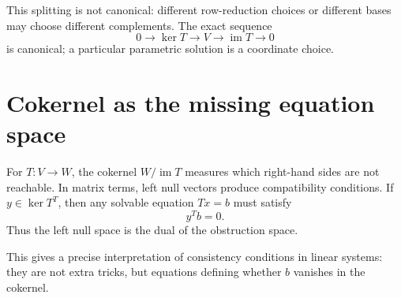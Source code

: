 This splitting is not canonical: different row-reduction choices or different bases may choose different complements.  The exact sequence
\[
  0\to\ker T\to V\to\operatorname{im}T\to0
\]
is canonical; a particular parametric solution is a coordinate choice.

\section{Cokernel as the missing equation space}

For $T:V\to W$, the cokernel $W/\operatorname{im}T$ measures which right-hand sides are not reachable.  In matrix terms, left null vectors produce compatibility conditions.  If $y\in\ker T^T$, then any solvable equation $Tx=b$ must satisfy
\[
  y^Tb=0.
\]
Thus the left null space is the dual of the obstruction space.

This gives a precise interpretation of consistency conditions in linear systems: they are not extra tricks, but equations defining whether $b$ vanishes in the cokernel.
